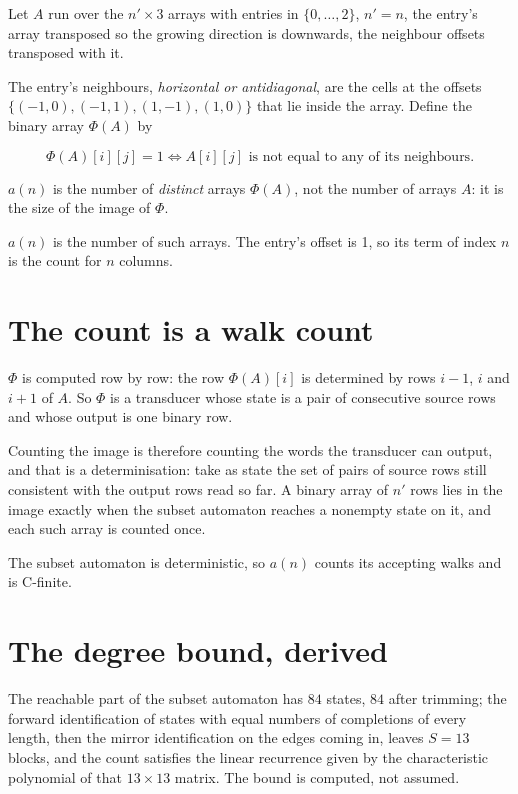 \documentclass[11pt]{article}
\theoremstyle{definition}
\begin{document}
Let $A$ run over the $n' \times 3$ arrays with entries in $\{0,\dots,2\}$, $n' = n$, the entry's array transposed so the growing direction is downwards, the neighbour offsets transposed with it.

The entry's neighbours, {\itshape horizontal or antidiagonal}, are the cells at the offsets $\{(-1,0), (-1,1), (1,-1), (1,0)\}$ that lie inside the array. Define the binary array $\Phi(A)$ by

\[\Phi(A)[i][j] = 1 \iff A[i][j] \text{ is not equal to any of its neighbours}.\]

$a(n)$ is the number of {\itshape distinct} arrays $\Phi(A)$, not the number of arrays $A$: it is the size of the image of $\Phi$.

$a(n)$ is the number of such arrays. The entry's offset is 1, so its term of index $n$ is the count for $n$ columns.

\section{The count is a walk count}

$\Phi$ is computed row by row: the row $\Phi(A)[i]$ is determined by rows $i-1$, $i$ and $i+1$ of $A$. So $\Phi$ is a transducer whose state is a pair of consecutive source rows and whose output is one binary row.

Counting the image is therefore counting the words the transducer can output, and that is a determinisation: take as state the set of pairs of source rows still consistent with the output rows read so far. A binary array of $n'$ rows lies in the image exactly when the subset automaton reaches a nonempty state on it, and each such array is counted once.

The subset automaton is deterministic, so $a(n)$ counts its accepting walks and is C-finite.

\section{The degree bound, derived}

The reachable part of the subset automaton has $84$ states, $84$ after trimming; the forward identification of states with equal numbers of completions of every length, then the mirror identification on the edges coming in, leaves $S = 13$ blocks, and the count satisfies the linear recurrence given by the characteristic polynomial of that $13\times13$ matrix. The bound is computed, not assumed.
\end{document}

